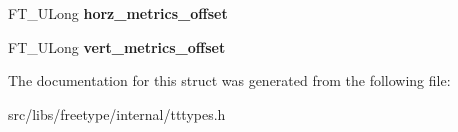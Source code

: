 \begin{DoxyCompactItemize}
\item 
\hypertarget{struct_t_t___face_rec___a5ff62c77d90743e333ca8dfa7d382f22}{
FT\_\-ULong {\bfseries horz\_\-metrics\_\-offset}}
\label{struct_t_t___face_rec___a5ff62c77d90743e333ca8dfa7d382f22}

\item 
\hypertarget{struct_t_t___face_rec___a33baf2e26d533d82f06875361fd423d1}{
FT\_\-ULong {\bfseries vert\_\-metrics\_\-offset}}
\label{struct_t_t___face_rec___a33baf2e26d533d82f06875361fd423d1}

\end{DoxyCompactItemize}


The documentation for this struct was generated from the following file:\begin{DoxyCompactItemize}
\item 
src/libs/freetype/internal/tttypes.h\end{DoxyCompactItemize}
